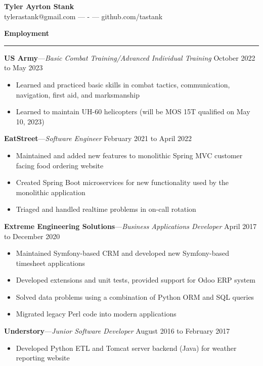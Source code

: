 \documentclass[12pt,letterpaper]{article}
\newenvironment{details}{
    \vspace{-.8em}
    \begin{itemize}
        \renewcommand \labelitemi{\labelitemiv}
        \setlength{\itemsep}{0pt}
        \setlength{\parskip}{-1pt}
        \setlength{\parsep}{0pt}
    }{
    \end{itemize}
    \vspace{-.5em}
}
\newcommand{\hr} {
    \vspace{-1em}
    \par\rule{\textwidth}{1pt}
    \vspace{-1.5em}
}
\newcommand{\ressection}[1] {
    \par{\large \textbf{#1}}
    \hr
}
\newenvironment{employment} {
    \setlength{\parskip}{0pt}
    \ressection{Employment}
}{
    \vspace{0.5em}
}
\newcommand{\employer}[3] {
    \vspace{3pt}
    {\par\textbf{#1}---\textit{#2} \hfill #3}
    \vspace{3pt}
    \par
}
\begin{document}
\thispagestyle{empty}

\begin{centering}
    {\huge \textbf{Tyler Ayrton Stank}}\\
    tylerastank@gmail.com ---  - --- github.com/tastank\\
\end{centering}


\begin{employment} 

\employer{US Army}{Basic Combat Training/Advanced Individual Training}{October 2022 to May 2023}
\begin{details}
    \item Learned and practiced basic skills in combat tactics, communication, navigation, first aid, and marksmanship
    \item Learned to maintain UH-60 helicopters (will be MOS 15T qualified on May 10, 2023)
\end{details}

\employer{EatStreet}{Software Engineer}{February 2021 to April 2022}
\begin{details}
    \item Maintained and added new features to monolithic Spring MVC customer facing food ordering website
    \item Created Spring Boot microservices for new functionality used by the monolithic application
    \item Triaged and handled realtime problems in on-call rotation
\end{details}

\employer{Extreme Engineering Solutions}{Business Applications Developer}{April 2017 to December 2020}
\begin{details}
    \item Maintained Symfony-based CRM and developed new Symfony-based timesheet applications
    \item Developed extensions and unit tests, provided support for Odoo ERP system
    \item Solved data problems using a combination of Python ORM and SQL queries
    \item Migrated legacy Perl code into modern applications
\end{details}

\employer{Understory}{Junior Software Developer}{August 2016 to February 2017}
\begin{details}
    \item Developed Python ETL and Tomcat server backend (Java) for weather reporting website
\end{details}


\end{employment}
\end{document}
